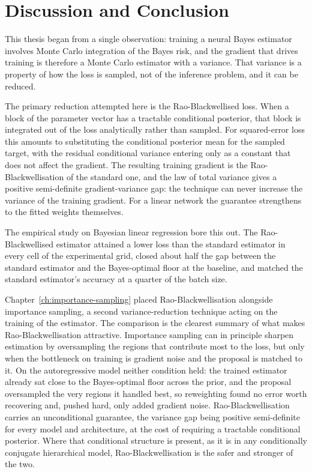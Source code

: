 \chapter{Discussion and Conclusion}
\label{ch:conclusion}



This thesis began from a single observation: training a neural Bayes
estimator involves Monte Carlo integration of the Bayes risk, and the
gradient that drives training is therefore a Monte Carlo estimator
with a variance. That variance is a property of how the loss is
sampled, not of the inference problem, and it can be reduced.

The primary reduction attempted here is the Rao-Blackwellised loss. When a
block of the parameter vector has a tractable conditional posterior,
that block is integrated out of the loss analytically rather than
sampled. For squared-error loss this amounts to substituting the
conditional posterior mean for the sampled target, with the residual
conditional variance entering only as a constant that does not affect
the gradient. The resulting training gradient is the
Rao-Blackwellisation of the standard one, and the law of total
variance gives a positive semi-definite gradient-variance gap: the
technique can never increase the variance of the training gradient.
For a linear network the guarantee strengthens to the fitted weights
themselves.

The empirical study on Bayesian linear regression bore this out. The
Rao-Blackwellised estimator attained a lower loss than the standard
estimator in every cell of the experimental grid, closed about half
the gap between the standard estimator and the Bayes-optimal floor at
the baseline, and matched the standard estimator's accuracy at a
quarter of the batch size.


Chapter~\ref{ch:importance-sampling} placed Rao-Blackwellisation
alongside importance sampling, a second variance-reduction technique
acting on the training of the estimator. The comparison is the
clearest summary of what makes Rao-Blackwellisation attractive.
Importance sampling can in principle sharpen estimation by
oversampling the regions that contribute most to the loss, but only
when the bottleneck on training is gradient noise and the proposal is
matched to it. On the autoregressive model neither condition held: the
trained estimator already sat close to the Bayes-optimal floor across
the prior, and the proposal oversampled the very regions it handled
best, so reweighting found no error worth recovering and, pushed hard,
only added gradient noise.
Rao-Blackwellisation carries an unconditional guarantee, the
variance gap being positive semi-definite for every model and
architecture, at the cost of requiring a tractable conditional
posterior. Where that conditional structure is present, as it is in
any conditionally conjugate hierarchical model, Rao-Blackwellisation
is the safer and stronger of the two.

